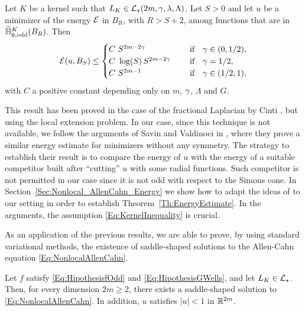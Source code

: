 \begin{theorem}
	\label{Th:EnergyEstimate} 
	Let $K$ be a kernel such that $L_K\in \mathcal{L}_\star(2m, \gamma, \lambda, \Lambda)$. Let $S>0$ and let $u$ be a minimizer of the energy $\mathcal{E}$ in $B_{R}$, with $R>S+2$, among functions that are in $\widetilde{\mathbb{H}}^K_{0, \mathrm{odd}}(B_R)$. Then
	$$ \mathcal{E} (u,B_S) \leq \begin{cases}
	C \ S^{2m-2\gamma}\ \ \ \ &\textrm{if } \ \ \gamma\in(0,1/2),\\
	C\ \log(S)\,S^{2m-2\gamma}\ \ \ \ &\textrm{if } \ \ \gamma=1/2,\\
	C \ S^{2m-1}\ \ \ \ &\textrm{if } \ \ \gamma\in(1/2,1),\\
	\end{cases} $$
	with $C$ a positive constant depending only on $m$, $\gamma$, $\Lambda$ and $G$.
\end{theorem}



This result has been proved in the case of the fractional Laplacian by Cinti \cite{Cinti-Saddle,Cinti-Saddle2}, but using the local extension problem. In our case, since this technique is not available, we follow the arguments of Savin and Valdinoci in \cite{SavinValdinoci-EnergyEstimate}, where they prove a similar energy estimate for minimizers without any symmetry. The strategy to establish their result is to compare the energy of $u$ with the energy of a suitable competitor built after ``cutting'' $u$ with some radial functions. Such competitor is not permitted in our case since it is not odd with respect to the Simons cone. In Section~\ref{Sec:Nonlocal_AllenCahn_Energy} we show how to adapt the ideas of \cite{SavinValdinoci-EnergyEstimate} to our setting in order to establish Theorem~\ref{Th:EnergyEstimate}. In the arguments, the assumption \eqref{Eq:KernelInequality} is crucial.



As an application of the previous results, we are able to prove, by using standard variational methods, the existence of saddle-shaped solutions to the Allen-Cahn equation \eqref{Eq:NonlocalAllenCahn}.

\begin{theorem}
	\label{Th:Existence}
    Let $f$ satisfy \eqref{Eq:HipothesisfOdd} and \eqref{Eq:HipothesisGWells}, and let $L_K\in \mathcal{L}_\star$. Then, for every dimension $2m \geq 2$, there exists a saddle-shaped solution to \eqref{Eq:NonlocalAllenCahn}. In addition, $u$ satisfies $|u|<1$ in $\mathbb{R}^{2m}$.
\end{theorem}

